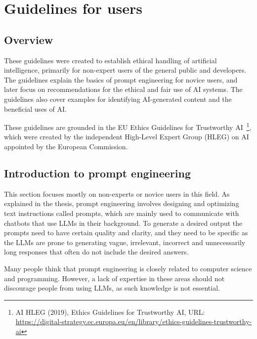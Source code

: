 \setcounter{figure}{0}
\setcounter{table}{0}
\setcounter{section}{0}
\setcounter{listing}{0}

\chapter{Guidelines for users \label{cha:guidelines}}
\renewcommand{\thepage}{B-\arabic{page}}


\minitoc
\clearpage

\section{Overview}
These guidelines were created to establish ethical handling of artificial intelligence, primarily for non-expert users of the general public and developers. The guidelines explain the basics of prompt engineering for novice users, and later focus on recommendations for the ethical and fair use of AI systems. The guidelines also cover examples for identifying AI-generated content and the beneficial uses of AI.

These guidelines are grounded in the EU Ethics Guidelines for Trustworthy AI~\footnote{AI HLEG (2019), Ethics Guidelines for Trustworthy AI, URL: \url{https://digital-strategy.ec.europa.eu/en/library/ethics-guidelines-trustworthy-ai}}, which were created by the independent High-Level Expert Group (HLEG) on AI appointed by the European Commission.

\section{Introduction to prompt engineering}
This section focuses mostly on non-experts or novice users in this field. As explained in the thesis, prompt engineering involves designing and optimizing text instructions called prompts, which are mainly used to communicate with chatbots that use LLMs in their background. To generate a desired output the prompts need to have certain quality and clarity, and they need to be specific as the LLMs are prone to generating vague, irrelevant, incorrect and unnecessarily long responses that often do not include the desired answers.

Many people think that prompt engineering is closely related to computer science and programming. However, a lack of expertise in these areas should not discourage people from using LLMs, as such knowledge is not essential.

